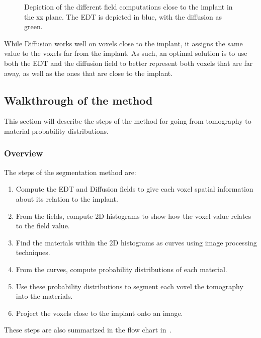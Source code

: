 \begin{figure}
    \centering
    \caption{Depiction of the different field computations close to the implant in the xz plane. The EDT is depicted in blue, with the diffusion as green.}
    \label{fig:edt-vs-diffusion}
\end{figure}

While Diffusion works well on voxels close to the implant, it assigns the same value to the voxels far from the implant. As such, an optimal solution is to use both the EDT and the diffusion field to better represent both voxels that are far away, as well as the ones that are close to the implant.


\subsection{Walkthrough of the method}
This section will describe the steps of the method for going from tomography to material probability distributions.

\subsubsection{Overview}
The steps of the segmentation method are:
\begin{enumerate}
    \item Compute the EDT and Diffusion fields to give each voxel spatial information about its relation to the implant.
    \item From the fields, compute 2D histograms to show how the voxel value relates to the field value.
    \item Find the materials within the 2D histograms as curves using image processing techniques.
    \item From the curves, compute probability distributions of each material.
    \item Use these probability distributions to segment each voxel the tomography into the materials.
    \item Project the voxels close to the implant onto an image.
\end{enumerate}
These steps are also summarized in the flow chart in~.

